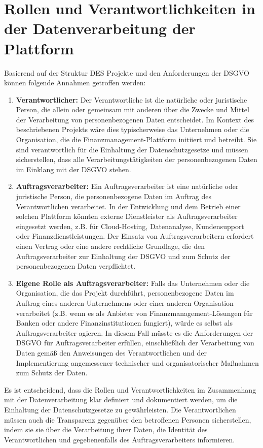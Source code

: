 \chapter{Rollen und Verantwortlichkeiten in der Datenverarbeitung der Plattform}

Basierend auf der Struktur DES Projekte und den Anforderungen der DSGVO können folgende Annahmen getroffen werden:

\begin{enumerate}
    \item \textbf{Verantwortlicher:}
    Der Verantwortliche ist die natürliche oder juristische Person, die allein oder gemeinsam mit anderen über die Zwecke und Mittel der Verarbeitung von personenbezogenen Daten entscheidet. Im Kontext des beschriebenen Projekts wäre dies typischerweise das Unternehmen oder die Organisation, die die Finanzmanagement-Plattform initiiert und betreibt. Sie sind verantwortlich für die Einhaltung der Datenschutzgesetze und müssen sicherstellen, dass alle Verarbeitungstätigkeiten der personenbezogenen Daten im Einklang mit der DSGVO stehen.

    \item \textbf{Auftragsverarbeiter:}
    Ein Auftragsverarbeiter ist eine natürliche oder juristische Person, die personenbezogene Daten im Auftrag des Verantwortlichen verarbeitet. In der Entwicklung und dem Betrieb einer solchen Plattform könnten externe Dienstleister als Auftragsverarbeiter eingesetzt werden, z.B. für Cloud-Hosting, Datenanalyse, Kundensupport oder Finanzdienstleistungen. Der Einsatz von Auftragsverarbeitern erfordert einen Vertrag oder eine andere rechtliche Grundlage, die den Auftragsverarbeiter zur Einhaltung der DSGVO und zum Schutz der personenbezogenen Daten verpflichtet.

    \item \textbf{Eigene Rolle als Auftragsverarbeiter:}
    Falls das Unternehmen oder die Organisation, die das Projekt durchführt, personenbezogene Daten im Auftrag eines anderen Unternehmens oder einer anderen Organisation verarbeitet (z.B. wenn es als Anbieter von Finanzmanagement-Lösungen für Banken oder andere Finanzinstitutionen fungiert), würde es selbst als Auftragsverarbeiter agieren. In diesem Fall müsste es die Anforderungen der DSGVO für Auftragsverarbeiter erfüllen, einschließlich der Verarbeitung von Daten gemäß den Anweisungen des Verantwortlichen und der Implementierung angemessener technischer und organisatorischer Maßnahmen zum Schutz der Daten.
\end{enumerate}


Es ist entscheidend, dass die Rollen und Verantwortlichkeiten im Zusammenhang mit der Datenverarbeitung klar definiert und dokumentiert werden, um die Einhaltung der Datenschutzgesetze zu gewährleisten. Die Verantwortlichen müssen auch die Transparenz gegenüber den betroffenen Personen sicherstellen, indem sie sie über die Verarbeitung ihrer Daten, die Identität des Verantwortlichen und gegebenenfalls des Auftragsverarbeiters informieren.